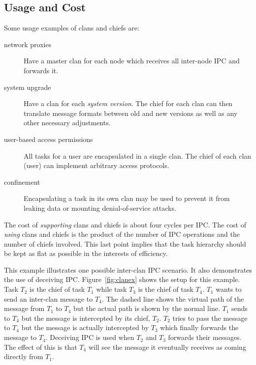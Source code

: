 
\subsection{Usage and Cost}


Some usage examples of clans and chiefs are:

\begin{description}

\item[network proxies] Have a master clan for each node which receives
  all inter-node IPC and forwards it.

\item[system upgrade] Have a clan for each \emph{system version}. The
  chief for each clan can then translate message formats between old
  and new versions as well as any other necessary adjustments.

\item[user-based access permissions] All tasks for a user are
  encapsulated in a single clan. The chief of each clan (user) can
  implement arbitrary access protocols.

\item[confinement] Encapsulating a task in its own clan may be used to
  prevent it from leaking data or mounting denial-of-service attacks.

\end{description}

The cost of \emph{supporting} clans and chiefs is about four cycles
per IPC.  The cost of \emph{using} clans and chiefs is the product of
the number of IPC operations and the number of chiefs involved. This
last point implies that the task hierarchy should be kept as flat as
possible in the interests of efficiency. \\ 


This example illustrates one possible inter-clan IPC scenario. It also
demonstrates the use of deceiving IPC. Figure~\ref{fig:clanex} shows
the setup for this example. Task $T_2$ is the chief of task $T_1$
while task $T_3$ is the chief of task $T_4$. $T_1$ wants to send an
inter-clan message to $T_4$. The dashed line shows the virtual path of
the message from $T_1$ to $T_4$ but the actual path is shown by the
normal line. $T_1$ sends to $T_4$ but the message is intercepted by
its chief, $T_2$. $T_2$ tries to pass the message to $T_4$ but the
message is actually intercepted by $T_3$ which finally forwards the
message to $T_4$. Deceiving IPC is used when $T_2$ and $T_3$ forwards
their messages. The effect of this is that $T_4$ will see the message
it eventually receives as coming directly from $T_1$. \\ 


